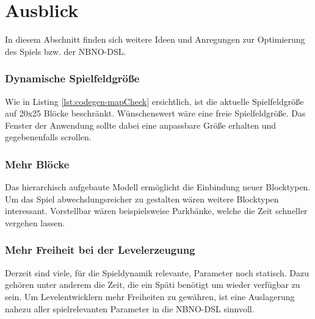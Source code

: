 \section{Ausblick}

In diesem Abschnitt finden sich weitere Ideen und Anregungen zur Optimierung des Spiels bzw. der NBNO-DSL.

\subsubsection{Dynamische Spielfeldgröße}
Wie in Listing \ref{lst:codegen-mapCheck} ersichtlich, ist die aktuelle Spielfeldgröße auf 20x25 Blöcke beschränkt.
Wünschenswert wäre eine freie Spielfeldgröße.
Das Fenster der Anwendung sollte dabei eine anpassbare Größe erhalten und gegebenenfalls scrollen.

\subsubsection{Mehr Blöcke}
Das hierarchisch aufgebaute Modell ermöglicht die Einbindung neuer Blocktypen.
Um das Spiel abwechslungsreicher zu gestalten wären weitere Blocktypen interessant.
Vorstellbar wären beispielsweise Parkbänke, welche die Zeit schneller vergehen lassen.

\subsubsection{Mehr Freiheit bei der Levelerzeugung}
Derzeit sind viele, für die Spieldynamik relevante, Parameter noch statisch.
Dazu gehören unter anderem die Zeit, die ein Späti benötigt um wieder verfügbar zu sein.
Um Levelentwicklern mehr Freiheiten zu gewähren, ist eine Auslagerung nahezu aller spielrelevanten Parameter in die NBNO-DSL sinnvoll.